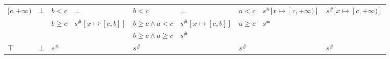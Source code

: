 \documentclass{article}
\begin{document}
\begin{table}
{\begin{tabular}{|l|l|ll|ll|ll|l|}
\multirow{3}{*}{$[c, +\infty)$} & \multirow{3}{*}{$\bot$} & $b < c$                    & $\bot$                                    & $b < c$                 & $\bot$                   & $a < c$                    & $s^\#[x \mapsto [c, +\infty)]$ & \multirow{3}{*}{$s^\#[x \mapsto [c, +\infty)]$} \\
                                &                         & \multirow{2}{*}{$b \ge c$} & \multirow{2}{*}{$s^\#[x \mapsto [c, b]]$} & $b \ge c \land a < c$   & $s^\#[x \mapsto [c, b]]$ & \multirow{2}{*}{$a \ge c$} & \multirow{2}{*}{$s^\#$}        &                                                 \\
                                &                         &                            &                                           & $b \ge c \land a \ge c$ & $s^\#$                   &                            &                                &                                                 \\ \hline
$\top$                          & $\bot$                  & \multicolumn{2}{l|}{$s^\#$}                                            & \multicolumn{2}{l|}{$s^\#$}                        & \multicolumn{2}{l|}{$s^\#$}                                 & $s^\#$                                          \\ \hline
\end{tabular}}
\end{table}
\end{document}
